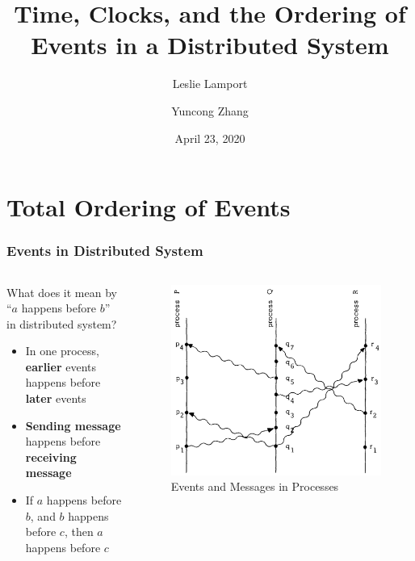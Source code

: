 \documentclass{beamer}
\title{Time, Clocks, and the Ordering of Events in a Distributed System}
\subtitle{Leslie Lamport}
\author{Yuncong Zhang}
\date{April 23, 2020}
\begin{document}
\frame{\titlepage}

\section[Outline]{}

\section{Total Ordering of Events}

\frame
{
  \frametitle{Events in Distributed System}
	\begin{columns}
	\begin{column}{0.6\textwidth}

		What does it mean by ``$a$ happens before $b$'' in distributed system?

		\begin{itemize}
			\item<2-> In one process, \textbf{earlier} events happens before \textbf{later} events
			\item<3-> \textbf{Sending message} happens before \textbf{receiving message}
			\item<4-> If $a$ happens before $b$, and $b$ happens before $c$, then $a$ happens before $c$
		\end{itemize}

	\end{column}
	\begin{column}{0.4\textwidth}

		\begin{figure}[ht!]
		\includegraphics[width=\textwidth]{files/events-messages.png}
		\caption{Events and Messages in Processes}
		\end{figure}


	\end{column}
	\end{columns}
}
\end{document}
